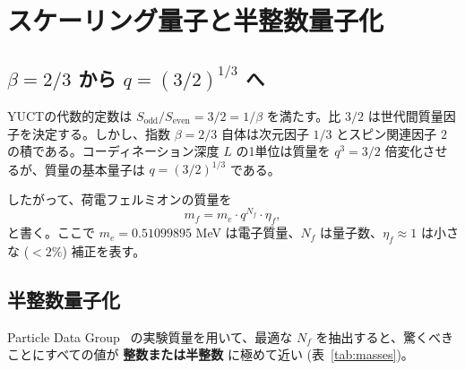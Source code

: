 \documentclass[12pt,a4paper]{article}
\begin{document}
	\section{スケーリング量子と半整数量子化}
	
	\subsection{\(\beta = 2/3\) から \(q = (3/2)^{1/3}\) へ}
	
	YUCTの代数的定数は \(S_{\mathrm{odd}}/S_{\mathrm{even}} = 3/2 = 1/\beta\) を満たす。比 \(3/2\) は世代間質量因子を決定する。しかし、指数 \(\beta = 2/3\) 自体は次元因子 \(1/3\) とスピン関連因子 \(2\) の積である。コーディネーション深度 \(L\) の1単位は質量を \(q^3 = 3/2\) 倍変化させるが、質量の基本量子は \(q = (3/2)^{1/3}\) である。
	
	したがって、荷電フェルミオンの質量を
	\begin{equation}
		m_f = m_e \cdot q^{N_f} \cdot \eta_f,
		\label{eq:quantized}
	\end{equation}
	と書く。ここで \(m_e = 0.51099895\) MeV は電子質量、\(N_f\) は量子数、\(\eta_f \approx 1\) は小さな (\(<2\%\)) 補正を表す。
	
	\subsection{半整数量子化}
	
	Particle Data Group~\cite{PDG2024} の実験質量を用いて、最適な \(N_f\) を抽出すると、驚くべきことにすべての値が \textbf{整数または半整数} に極めて近い (表~\ref{tab:masses})。
	
\end{document}
